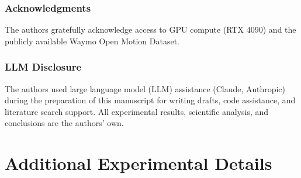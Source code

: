 \documentclass{article} %
\begin{document}
\subsubsection*{Acknowledgments}
The authors gratefully acknowledge access to GPU compute (RTX 4090) and the
publicly available Waymo Open Motion Dataset.

\subsubsection*{LLM Disclosure}
The authors used large language model (LLM) assistance (Claude, Anthropic) during
the preparation of this manuscript for writing drafts, code assistance, and
literature search support. All experimental results, scientific analysis, and
conclusions are the authors' own.




\appendix
\section{Additional Experimental Details}
\label{app:details}
\end{document}
